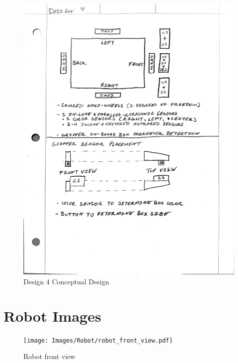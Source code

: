 \documentclass[12pt]{report}
\begin{document}
\begin{figure}[H]
    \centering
    \includegraphics[width=1\textwidth]{Images/Designs/Design4.pdf}
    \caption{Design 4 Conceptual Design}
    \label{fig:design4}
\end{figure}

\section{Robot Images}

\begin{figure}[H]
    \centering
    \texttt{[image: Images/Robot/robot\_front\_view.pdf]}
    \caption{Robot front view}
    \label{fig:front-view}
\end{figure}
\end{document}
